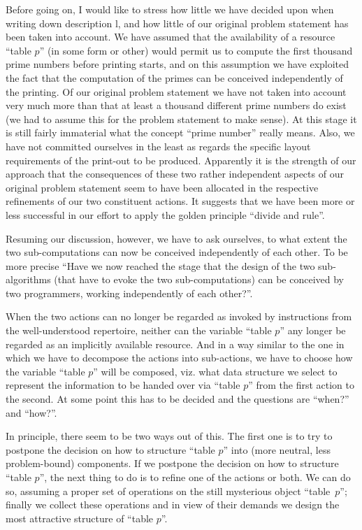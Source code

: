 Before going on, I would like to stress how little we have decided upon when writing down description l, and how little of our original problem statement has been taken into account. We have assumed that the availability of a resource ``table $p$'' (in some form or other) would permit us to compute the first thousand prime numbers before printing starts, and on this assumption we have exploited the fact that the computation of the primes can be conceived independently of the printing. Of our original problem statement we have not taken into account very much more than that at least a thousand different prime numbers do exist (we had to assume this for the problem statement to make sense). At this stage it is still fairly immaterial what the concept ``prime number'' really means. Also, we have not committed ourselves in the least as regards the specific layout requirements of the print-out to be produced. Apparently it is the strength of our approach that the consequences of these two rather independent aspects of our original problem statement seem to have been allocated in the respective refinements of our two constituent actions. It suggests that we have been more or less successful in our effort to apply the golden principle ``divide and rule''.

Resuming our discussion, however, we have to ask ourselves, to what extent the two sub-computations can now be conceived independently of each other. To be more precise ``Have we now reached the stage that the design of the two sub-algorithms (that have to evoke the two sub-computations) can be conceived by two programmers, working independently of each other?''.

When the two actions can no longer be regarded as invoked by instructions from the well-understood repertoire, neither can the variable ``table $p$'' any longer be regarded as an implicitly available resource. And in a way similar to the one in which we have to decompose the actions into sub-actions, we have to choose how the variable ``table $p$'' will be composed, viz. what data structure we select to represent the information to be handed over via ``table $p$'' from the first action to the second. At some point this has to be decided and the questions are ``when?'' and ``how?''.

In principle, there seem to be two ways out of this. The first one is to try to postpone the decision on how to structure ``table $p$'' into (more neutral, less problem-bound) components. If we postpone the decision on how to structure ``table $p$'', the next thing to do is to refine one of the actions or both. We can do so, assuming a proper set of operations on the still mysterious object \mbox{``table $p$'';} finally we collect these operations and in view of their demands we design the most attractive structure of ``table $p$''.

